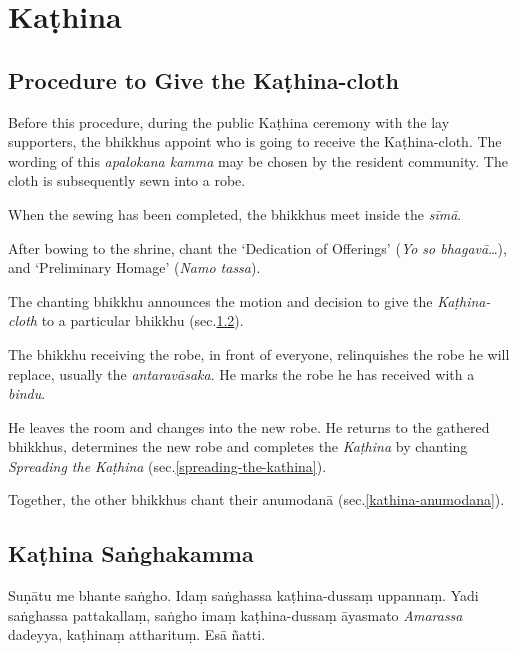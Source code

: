 
\section{Kaṭhina}

\subsection{Procedure to Give the Kaṭhina-cloth}

Before this procedure, during the public Kaṭhina ceremony with the lay
supporters, the bhikkhus appoint who is going to receive the Kaṭhina-cloth. The
wording of this \emph{apalokana kamma} may be chosen by the resident community.
The cloth is subsequently sewn into a robe.

When the sewing has been completed, the bhikkhus meet inside the \emph{sīmā}.

After bowing to the shrine, chant the `Dedication of Offerings' (\emph{Yo so
  bhagavā}\ldots), and `Preliminary Homage' (\emph{Namo tassa}).

The chanting bhikkhu announces the motion and decision to give the
\emph{Kaṭhina-cloth} to a particular bhikkhu (sec.\ref{kathina-sanghakamma}).

The bhikkhu receiving the robe, in front of everyone, relinquishes the robe he
will replace, usually the \emph{antaravāsaka}. He marks the robe he has received
with a \emph{bindu}.

He leaves the room and changes into the new robe. He returns to the
gathered bhikkhus, determines the new robe and completes the \emph{Kaṭhina} by
chanting \emph{Spreading the Kaṭhina} (sec.\ref{spreading-the-kathina}).

Together, the other bhikkhus chant their anumodanā (sec.\ref{kathina-anumodana}).

\subsection{Kaṭhina Saṅghakamma}
\label{kathina-sanghakamma}

\enlargethispage{\baselineskip}


Suṇātu me bhante saṅgho. Idaṃ saṅghassa kaṭhina-dussaṃ uppannaṃ. Yadi saṅghassa
pattakallaṃ, saṅgho imaṃ kaṭhina-dussaṃ āyasmato \emph{Amarassa} dadeyya,
kaṭhinaṃ attharituṃ. Esā ñatti.

